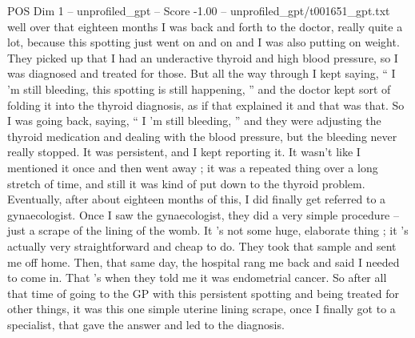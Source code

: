 \begin{textsample}{POS Dim 1 – unprofiled\_gpt – Score -1.00 – unprofiled\_gpt/t001651\_gpt.txt}  \label{ex:f1_pos_027}
well over that eighteen months I was back and forth to the doctor, really quite a lot, because this spotting just went on and on and I was also putting on weight.
They picked up that I had an underactive thyroid and high blood pressure, so I was diagnosed and treated for those.
But all the way through I kept saying, “ I ’m still bleeding, this spotting is still happening, ” and the doctor kept sort of folding it into the thyroid diagnosis, as if that explained it and that was that.
So I was going back, saying, “ I ’m still bleeding, ” and they were adjusting the thyroid medication and dealing with the blood pressure, but the bleeding never really stopped.
It was persistent, and I kept reporting it.
It wasn't like I mentioned it once and then went away ; it was a repeated thing over a long stretch of time, and still it was kind of put down to the thyroid problem.
Eventually, after about eighteen months of this, I did finally get referred to a gynaecologist.
Once I saw the gynaecologist, they did a very simple procedure – just a scrape of the lining of the womb.
It ’s not some huge, elaborate thing ; it ’s actually very straightforward and cheap to do.
They took that sample and sent me off home.
Then, that same day, the hospital rang me back and said I needed to come in.
That ’s when they told me it was endometrial cancer.
So after all that time of going to the GP with this persistent spotting and being treated for other things, it was this one simple uterine lining scrape, once I finally got to a specialist, that gave the answer and led to the diagnosis.

\end{textsample}
